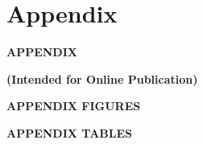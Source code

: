 \documentclass[11pt, a4paper]{article} %
\begin{document}



\newpage
\TODO\section{Appendix}
\vspace*{\fill}
{\Huge \begin{center}\textbf{APPENDIX}\end{center}}
{\huge\begin{center}\textbf{(Intended for Online Publication)}\end{center}}
\vspace*{\fill}\clearpage

\renewcommand\thesection{V}
\renewcommand\thefigure{V.\arabic{figure}}
\setcounter{figure}{0} 
\captionsetup[subfigure]{labelformat=parens}
\renewcommand\thetable{V.\arabic{table}}
\setcounter{table}{0} 






\newpage
\vspace*{\fill}
{\Huge \begin{center}\textbf{APPENDIX FIGURES}\end{center}}
\vspace*{\fill}\clearpage


\renewcommand\thefigure{A.\arabic{figure}}
\setcounter{figure}{0} 
\captionsetup[subfigure]{labelformat=parens}
\renewcommand\thetable{A.\arabic{table}}
\setcounter{table}{0} 







\vspace*{\fill}
{\Huge \begin{center}\textbf{APPENDIX TABLES}\end{center}}
\vspace*{\fill}\clearpage


\end{document}
